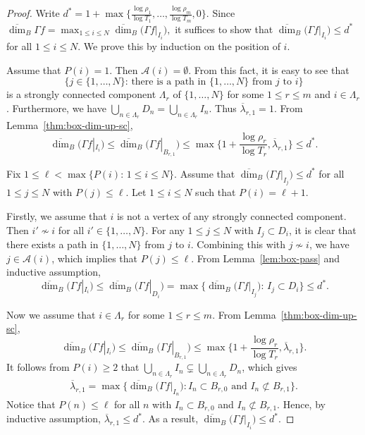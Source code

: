 \documentclass[11pt]{amsart}
\theoremstyle{definition}
\theoremstyle{remark}
\numberwithin{equation}{section}
\newcommand{\mA}{{\mathcal A}}
\newcommand{\uplam}{{\overline{\lambda}}}
\newcommand{\uprho}{{{\rho}}}
\def\updimB{\overline{\dim}_B}
\begin{document}
\begin{proof}
Write $d^* =1 + \max\Big\{  \frac{\log\uprho_1}{\log T_1},\ldots, \frac{\log \uprho_m}{ \log T_m},0 \Big\}$.  
Since $\updimB \Gamma f =\max_{1\leq i\leq N}\updimB \big(\Gamma f|_{I_{i}}\big),$
 it suffices to show that $ \updimB \big(\Gamma f|_{I_i}\big) \leq d^*$ for all $1\leq i\leq N$. We prove this by induction on the position of $i$.

Assume that $P(i)=1$. Then $\mA(i)=\emptyset$. From this fact, it is easy to see that
$$\big\{j\in \{1,\ldots,N\}:\, \mbox{there is a path in $\{1,\ldots,N\}$ from $j$ to $i$} \big\}$$
is a strongly connected component $\Lambda_r$ of $\{1,\ldots,N\}$ for some $1\leq r\leq m$ and $i\in \Lambda_r$. 
Furthermore, we have $\bigcup_{n\in \Lambda_r} D_n=\bigcup_{n\in \Lambda_r}I_n$. Thus $\uplam_{r,1}=1$. From Lemma~\ref{thm:box-dim-up-sc},
$$\updimB \big(\Gamma f|_{I_i}\big)\leq \updimB \big(\Gamma f|_{B_{r,1}}\big) \leq \max\Big\{ 1+ \frac{\log    \uprho_r   }{ \log T_r}, \uplam_{r,1}\Big\}\leq d^*. $$

Fix $1\leq \ell<\max\{P(i):\, 1\leq i\leq N\}$. Assume that $\updimB \big(\Gamma f|_{I_j} \big) \leq d^*$ for all $1\leq j \leq N$ with $P(j)\leq \ell$. Let $1\leq i\leq N$ such that $P(i)= \ell+1$. 

Firstly, we assume that $i$ is not a vertex of any strongly connected component.
Then
$i'\not\sim i$ for all $i'\in\{1,\ldots,N\}$.
For any $1\leq j \leq N$ with $I_{j}\subset D_{i}$, it is clear that there exists a path in $\{1,\ldots,N\}$ from $j$ to $i$. Combining this with $j\not\sim i$, we have $j\in \mA(i) $, which implies that 
$P(j)\leq \ell$. From Lemma~\ref{lem:box-pass} and inductive assumption,
\[ \updimB \big(\Gamma f|_{I_i}\big)  \leq  \updimB \big(\Gamma f|_{D_i}\big) =\max\big\{\updimB \big(\Gamma f|_{I_j}\big):\,I_{j}\subset D_{i}\big\}\leq d^*. \]

Now we assume that $ i \in \Lambda_r$ for some $1\leq r\leq m $. From Lemma~\ref{thm:box-dim-up-sc},
$$\updimB \big(\Gamma f|_{I_i}\big)\leq \updimB \big(\Gamma f|_{B_{r,1}}\big) \leq \max\Big\{ 1+ \frac{\log    \uprho_r   }{ \log T_r}, \uplam_{r,1}\Big\}. $$ 
It follows from $P(i)\geq 2$ that $\bigcup_{n\in \Lambda_r} I_n \subsetneq\bigcup_{n\in \Lambda_r} D_n$, which gives
\begin{align*}
	\uplam_{r,1} =\max\Big\{ \updimB \big(\Gamma f|_{I_n}\big): I_n\subset B_{r,0} \textrm{ and } I_n\not\subset B_{r,1} \Big\}. 
\end{align*}
Notice that $P(n)\leq \ell$ for all $n$ with $I_n\subset B_{r,0}$ and $I_n\not\subset B_{r,1}$.
Hence, by inductive assumption, $\uplam_{r,1}\leq d^*$. As a result, $\updimB \big(\Gamma f|_{I_i}\big) \leq d^*$.
\end{proof}
\end{document}
